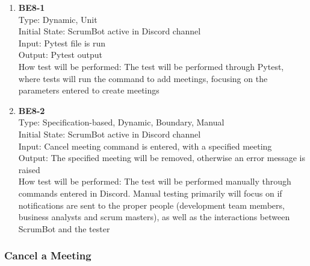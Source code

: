 \documentclass[12pt, titlepage]{article}
\begin{document}
\begin{enumerate}
    \item{\textbf{BE8-1}}\\
    Type: Dynamic, Unit\\
    Initial State: ScrumBot active in Discord channel\\
    Input: Pytest file is run\\
    Output: Pytest output\\
    How test will be performed: The test will be performed through Pytest, where tests will run the command to add meetings, focusing on the parameters entered to create meetings\\
    
    \item{\textbf{BE8-2}}\\
    Type: Specification-based, Dynamic, Boundary, Manual\\
    Initial State: ScrumBot active in Discord channel\\
    Input: Cancel meeting command is entered, with a specified meeting\\
    Output: The specified meeting will be removed, otherwise an error message is raised\\
    How test will be performed: The test will be performed manually through commands entered in Discord. Manual testing primarily will focus on if notifications are sent to the proper people (development team members, business analysts and scrum masters), as well as the interactions between ScrumBot and the tester\\
\end{enumerate}

\subsubsection{Cancel a Meeting}
\end{document}
